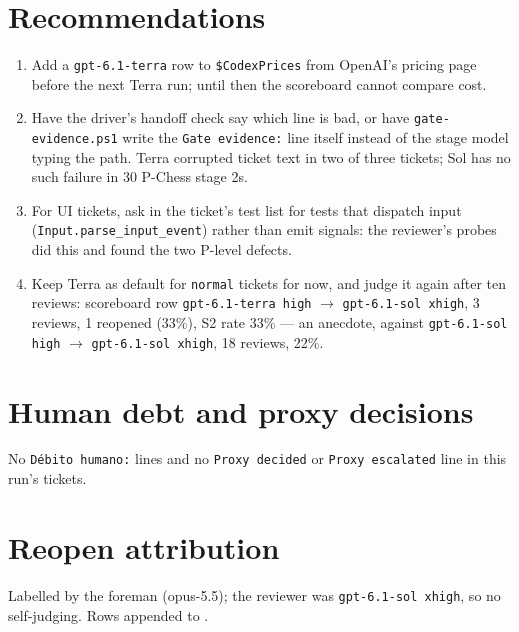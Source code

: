 \documentclass[11pt,a4paper]{article}
\begin{document}
\section*{Recommendations}

\begin{enumerate}
  \item Add a \texttt{gpt-6.1-terra} row to \texttt{\$CodexPrices} from OpenAI's pricing page
        before the next Terra run; until then the scoreboard cannot compare cost.
  \item Have the driver's handoff check say which line is bad, or have \texttt{gate-evidence.ps1}
        write the \texttt{Gate evidence:} line itself instead of the stage model typing the path.
        Terra corrupted ticket text in two of three tickets; Sol has no such failure in 30
        P-Chess stage 2s.
  \item For UI tickets, ask in the ticket's test list for tests that dispatch input
        (\texttt{Input.parse\_input\_event}) rather than emit signals: the reviewer's probes did
        this and found the two P-level defects.
  \item Keep Terra as default for \texttt{normal} tickets for now, and judge it again after ten
        reviews: scoreboard row \texttt{gpt-6.1-terra high} $\rightarrow$
        \texttt{gpt-6.1-sol xhigh}, 3 reviews, 1 reopened (33\%), S2 rate 33\% --- an
        anecdote, against \texttt{gpt-6.1-sol high} $\rightarrow$ \texttt{gpt-6.1-sol xhigh},
        18 reviews, 22\%.
\end{enumerate}

\section*{Human debt and proxy decisions}

No \texttt{Débito humano:} lines and no \texttt{Proxy decided} or \texttt{Proxy escalated} line
in this run's tickets.

\section*{Reopen attribution}

Labelled by the foreman (opus-5.5); the reviewer was \texttt{gpt-6.1-sol xhigh}, so no
self-judging. Rows appended to .
\end{document}
